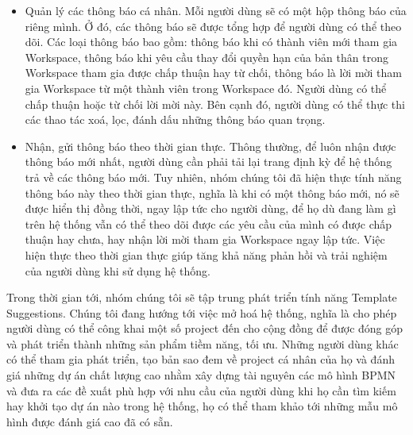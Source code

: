 \begin{itemize}
    \item Quản lý các thông báo cá nhân. Mỗi người dùng sẽ có một hộp thông báo của riêng mình. Ở đó, các thông báo sẽ được tổng hợp để người dùng có thể theo dõi. Các loại thông báo bao gồm: thông báo khi có thành viên mới tham gia Workspace, thông báo khi yêu cầu thay đổi quyền hạn của bản thân trong Workspace tham gia được chấp thuận hay từ chối, thông báo là lời mời tham gia Workspace từ một thành viên trong Workspace đó. Người dùng có thể chấp thuận hoặc từ chối lời mời này. Bên cạnh đó, người dùng có thể thực thi các thao tác xoá, lọc, đánh dấu những thông báo quan trọng.
    \item Nhận, gửi thông báo theo thời gian thực. Thông thường, để luôn nhận được thông báo mới nhất, người dùng cần phải tải lại trang định kỳ để hệ thống trả về các thông báo mới. Tuy nhiên, nhóm chúng tôi đã hiện thực tính năng thông báo này theo thời gian thực, nghĩa là khi có một thông báo mới, nó sẽ được hiển thị đồng thời, ngay lập tức cho người dùng, để họ dù đang làm gì trên hệ thống vẫn có thể theo dõi được các yêu cầu của mình có được chấp thuận hay chưa, hay nhận lời mời tham gia Workspace ngay lập tức. Việc hiện thực theo thời gian thực giúp tăng khả năng phản hồi và trải nghiệm của người dùng khi sử dụng hệ thống.
\end{itemize}
Trong thời gian tới, nhóm chúng tôi sẽ tập trung phát triển tính năng Template Suggestions. Chúng tôi đang hướng tới việc mở hoá hệ thống, nghĩa là cho phép người dùng có thể công khai một số project đến cho cộng đồng để được đóng góp và phát triển thành những sản phẩm tiềm năng, tối ưu. Những người dùng khác có thể tham gia phát triển, tạo bản sao đem về project cá nhân của họ và đánh giá những dự án chất lượng cao nhằm xây dựng tài nguyên các mô hình BPMN và đưa ra các đề xuất phù hợp với nhu cầu của người dùng khi họ cần tìm kiếm hay khởi tạo dự án nào trong hệ thống, họ có thể tham khảo tới những mẫu mô hình được đánh giá cao đã có sẵn.
\newline



